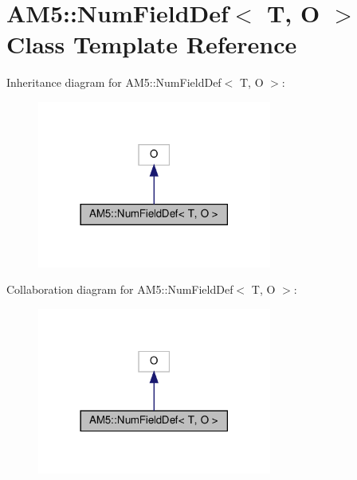 \hypertarget{classAM5_1_1NumFieldDef}{}\section{A\+M5\+:\+:Num\+Field\+Def$<$ T, O $>$ Class Template Reference}
\label{classAM5_1_1NumFieldDef}


Inheritance diagram for A\+M5\+:\+:Num\+Field\+Def$<$ T, O $>$\+:\nopagebreak
\begin{figure}[H]
\begin{center}
\leavevmode
\includegraphics[width=218pt]{classAM5_1_1NumFieldDef__inherit__graph}
\end{center}
\end{figure}


Collaboration diagram for A\+M5\+:\+:Num\+Field\+Def$<$ T, O $>$\+:\nopagebreak
\begin{figure}[H]
\begin{center}
\leavevmode
\includegraphics[width=218pt]{classAM5_1_1NumFieldDef__coll__graph}
\end{center}
\end{figure}
